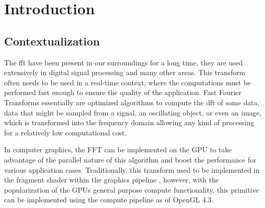 \documentclass[
  oneside,
  11pt, a4paper,
  footinclude=true,
  headinclude=true,
  cleardoublepage=empty
]{scrbook}
\begin{document}
    \cleardoublepage
    
    \setcounter{page}{3}
    
    \cleardoublepage
    \tableofcontents
    
    \cleardoublepage
    \listoffigures
    
    \cleardoublepage
    \listoftables
            
    \cleardoublepage
    \lstlistoflistings

    \printglossary[type=\acronymtype]
    
    \cleardoublepage
    \setcounter{page}{5}


\chapter{Introduction} \label{chap:introduction}

\section{Contextualization} \label{sec:contextualization}

The \acrfull{fft} have been present in our surroundings for a long time, they are used extensively in digital signal processing and many other areas. This transform often needs to be used in a real-time context, where the computations must be performed fast enough to ensure the quality of the application. Fast Fourier Transforms essentially are optimized algorithms to compute the \acrfull{dft} of some data, data that might be sampled from a signal, an oscillating object, or even an image, which is transformed into the frequency domain allowing any kind of processing for a relatively low computational cost. 

In computer graphics, the FFT can be implemented on the GPU to take advantage of the parallel nature of this algorithm and boost the performance for various application cases. Traditionally, this transform used to be implemented in the fragment shader within the graphics pipeline \cite{moreland2003fft}, however, with the popularization of the GPUs general purpose compute functionality, this primitive can be implemented using the compute pipeline as of OpenGL 4.3.
\end{document}
